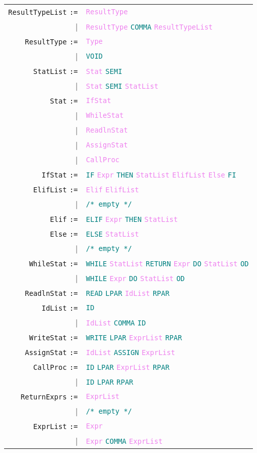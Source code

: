 \documentclass[a4paper,12pt]{article}
\newcommand\nonterm[1]{\texttt{\textcolor{violet}{#1}}}
\newcommand\term[1]{\texttt{\textcolor{teal}{#1}}}
\newcommand\production[1]{\texttt{#1} \texttt{:=}}
\newcommand\emptyprod{\texttt{\textcolor{teal}{/* empty */}}}
\begin{document}
	\begin{tabular}{rl}
	\production{ResultTypeList} & \nonterm{ResultType} \\
						  |& \nonterm{ResultType} \term{COMMA} \nonterm{ResultTypeList} \\
	\production{ResultType}       & \nonterm{Type} \\
						  |& \term{VOID} \\
	\production{StatList} 		   & \nonterm{Stat} \term{SEMI} \\
						  |& \nonterm{Stat} \term{SEMI} \nonterm{StatList} \\
	\production{Stat}                  & \nonterm{IfStat} \\
						  |& \nonterm{WhileStat} \\
						  |& \nonterm{ReadlnStat} \\
						  |& \nonterm{AssignStat} \\
						  |& \nonterm{CallProc} \\
    \production{IfStat}                   & \term{IF} \nonterm{Expr} \term{THEN} \nonterm{StatList} \nonterm{ElifList} \nonterm{Else} \term{FI} \\
    \production{ElifList}                 & \nonterm{Elif} \nonterm{ElifList} \\
    						|& \emptyprod \\
   \production{Elif}			 & \term{ELIF} \nonterm{Expr} \term{THEN} \nonterm{StatList} \\
   \production{Else}   			 & \term{ELSE} \nonterm{StatList} \\
   						|& \emptyprod \\
   \production{WhileStat}             & \term{WHILE} \nonterm{StatList} \term{RETURN} \nonterm{Expr} \term{DO} \nonterm{StatList} \term{OD} \\
   						|& \term{WHILE} \nonterm{Expr} \term{DO} \nonterm{StatList} \term{OD} \\
  \production{ReadlnStat}           & \term{READ} \term{LPAR} \nonterm{IdList} \term{RPAR} \\
  \production{IdList}                    & \term{ID} \\
					        |& \nonterm{IdList} \term{COMMA} \term{ID} \\
  \production{WriteStat}              & \term{WRITE} \term{LPAR} \nonterm{ExprList} \term{RPAR} \\
  \production{AssignStat}           & \nonterm{IdList} \term{ASSIGN} \nonterm{ExprList} \\
  \production{CallProc}         & \term{ID} \term{LPAR} \nonterm{ExprList} \term{RPAR} \\
						|& \term{ID} \term{LPAR} \term{RPAR} \\
  \production{ReturnExprs}    & \nonterm{ExprList} \\
						 |& \emptyprod \\
	\production{ExprList}           & \nonterm{Expr} \\
						 |& \nonterm{Expr} \term{COMMA} \nonterm{ExprList} \\
   \end{tabular}
\end{document}
